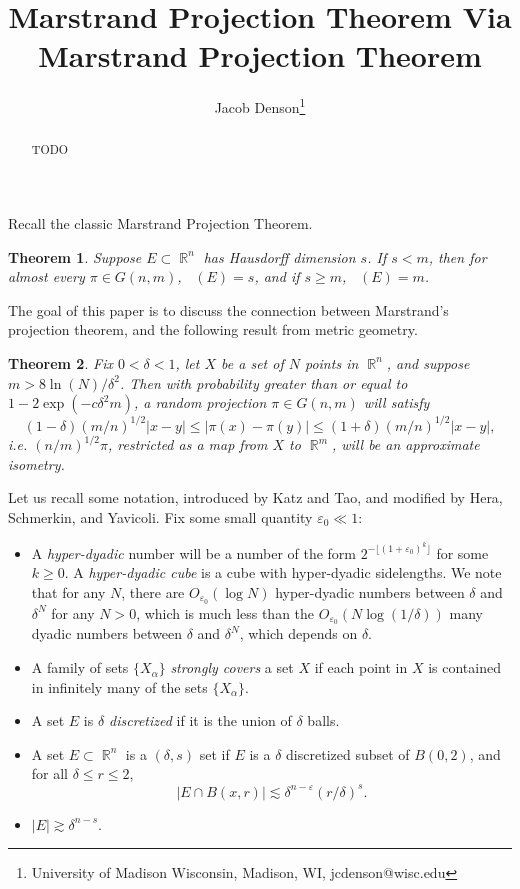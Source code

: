 \documentclass[dvipsnames,letterpaper,12pt]{article}
\title{Marstrand Projection Theorem Via Marstrand Projection Theorem}
\author{Jacob Denson\footnote{University of Madison Wisconsin, Madison, WI, jcdenson@wisc.edu}}
\numberwithin{equation}{section}
\DeclareMathOperator{\hausdim}{\dim_{\mathbb{H}}}
\DeclareMathOperator{\RR}{\mathbb{R}}
\newtheorem{theorem}{Theorem}
\numberwithin{theorem}{section}
\begin{document}
\maketitle

\begin{abstract}
    TODO
\end{abstract}

Recall the classic Marstrand Projection Theorem.

\begin{theorem}
    Suppose $E \subset \RR^n$ has Hausdorff dimension $s$. If $s < m$, then for almost every $\pi \in G(n,m)$, $\hausdim(E) = s$, and if $s \geq m$, $\hausdim(E) = m$.
\end{theorem}

The goal of this paper is to discuss the connection between Marstrand's projection theorem, and the following result from metric geometry.

\begin{theorem}
    Fix $0 < \delta < 1$, let $X$ be a set of $N$ points in $\RR^n$, and suppose $m > 8 \ln(N) / \delta^2$. Then with probability greater than or equal to $1 - 2 \exp(-c \delta^2 m)$, a random projection $\pi \in G(n,m)$ will satisfy
    \[ (1 - \delta)(m/n)^{1/2} |x - y| \leq |\pi(x) - \pi(y)| \leq (1 + \delta) (m/n)^{1/2} |x - y|, \]
    i.e. $(n/m)^{1/2} \pi$, restricted as a map from $X$ to $\RR^m$, will be an approximate isometry.
\end{theorem}

Let us recall some notation, introduced by Katz and Tao, and modified by Hera, Schmerkin, and Yavicoli. Fix some small quantity $\varepsilon_0 \ll 1$:
%
\begin{itemize}
    \item A \emph{hyper-dyadic} number will be a number of the form $2^{-\lfloor (1 + \varepsilon_0)^k \rfloor}$ for some $k \geq 0$. A \emph{hyper-dyadic cube} is a cube with hyper-dyadic sidelengths. We note that for any $N$, there are $O_{\varepsilon_0}(\log N)$ hyper-dyadic numbers between $\delta$ and $\delta^N$ for any $N > 0$, which is much less than the $O_{\varepsilon_0}(N \log(1/\delta))$ many dyadic numbers between $\delta$ and $\delta^N$, which depends on $\delta$.

    \item A family of sets $\{ X_\alpha \}$ \emph{strongly covers} a set $X$ if each point in $X$ is contained in infinitely many of the sets $\{ X_\alpha \}$.

    \item A set $E$ is \emph{$\delta$ discretized} if it is the union of $\delta$ balls.

    \item A set $E \subset \RR^n$ is a $(\delta,s)$ set if $E$ is a $\delta$ discretized subset of $B(0,2)$, and for all $\delta \leq r \leq 2$,
    \[ |E \cap B(x,r)| \lesssim \delta^{n-\varepsilon} (r/\delta)^s. \]

    \item $|E| \gtrsim \delta^{n-s}$.
\end{itemize}
\end{document}
